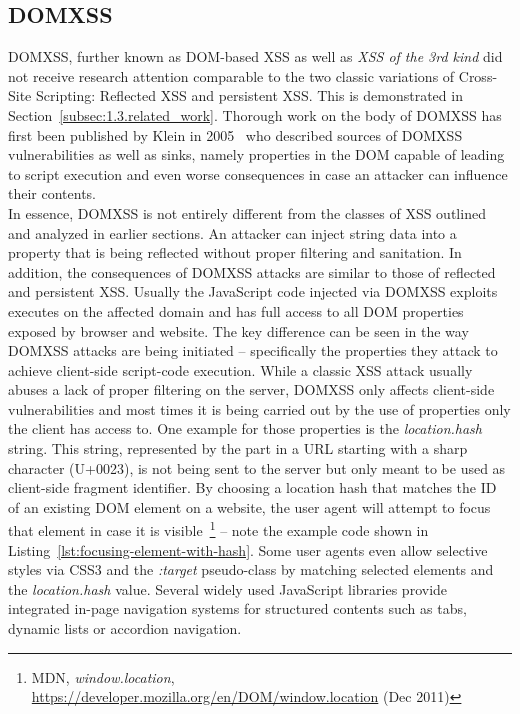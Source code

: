     \subsection{DOMXSS}
    \label{subsubsec:5.4.4.domxss}

    DOMXSS, further known as DOM-based XSS as well as \textit{XSS of the 3rd kind} did not receive research attention comparable to the two classic variations of Cross-Site Scripting: Reflected XSS and persistent XSS. This is demonstrated in Section~\ref{subsec:1.3.related_work}. Thorough work on the body of DOMXSS has first been published by Klein in 2005~\cite{klein_dom_2005} who described sources of DOMXSS vulnerabilities as well as sinks, namely properties in the DOM capable of leading to script execution and even worse consequences in case an attacker can influence their contents. \\

    In essence, DOMXSS is not entirely different from the classes of XSS outlined and analyzed in earlier sections. An attacker can inject string data into a property that is being reflected without proper filtering and sanitation. In addition, the consequences of DOMXSS attacks are similar to those of reflected and persistent XSS. Usually the JavaScript code injected via DOMXSS exploits executes on the affected domain and has full access to all DOM properties exposed by browser and website. The key difference can be seen in the way DOMXSS attacks are being initiated -- specifically the properties they attack to achieve client-side script-code execution. While a classic XSS attack usually abuses a lack of proper filtering on the server, DOMXSS only affects client-side vulnerabilities and most times it is being carried out by the use of properties only the client has access to. One example for those properties is the \textit{location.hash} string. This string, represented by the part in a URL starting with a 
sharp character (U+0023), is not being sent to the server but only meant to be used as client-side fragment identifier. By choosing a location hash that matches the ID of an existing DOM element on a website, the user agent will attempt to focus that element in case it is visible~\footnote{MDN, \textit{window.location}, \url{https://developer.mozilla.org/en/DOM/window.location} (Dec 2011)} -- note the example code shown in Listing~\ref{lst:focusing-element-with-hash}. Some user agents even allow selective styles via CSS3 and the \textit{:target} pseudo-class by matching selected elements and the \textit{location.hash} value. Several widely used JavaScript libraries provide integrated in-page navigation systems for structured contents such as tabs, dynamic lists or accordion navigation. \\

